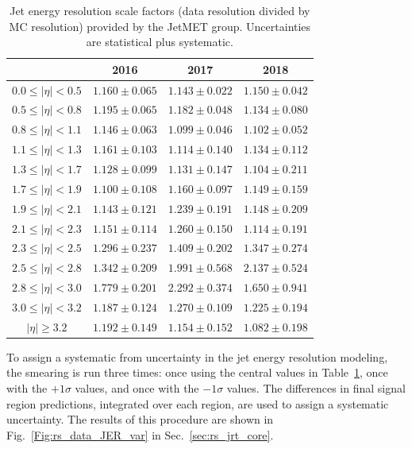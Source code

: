 \begin{table}[htp]
\caption{Jet energy resolution scale factors (data resolution divided by MC resolution) provided by the JetMET group.
             Uncertainties are statistical plus systematic.}
\label{tab:jrt_jersfs}
\centering
\begin{tabular}{|c|ccc|}
\hline
 & 2016 & 2017 & 2018 \\ \hline
$0.0 \leq |\eta| < 0.5$ & $1.160\pm0.065$ & $1.143\pm0.022$ & $1.150\pm0.042$ \\
$0.5 \leq |\eta| < 0.8$ & $1.195\pm0.065$ & $1.182\pm0.048$ & $1.134\pm0.080$ \\
$0.8 \leq |\eta| < 1.1$ & $1.146\pm0.063$ & $1.099\pm0.046$ & $1.102\pm0.052$ \\
$1.1 \leq |\eta| < 1.3$ & $1.161\pm0.103$ & $1.114\pm0.140$ & $1.134\pm0.112$ \\
$1.3 \leq |\eta| < 1.7$ & $1.128\pm0.099$ & $1.131\pm0.147$ & $1.104\pm0.211$ \\
$1.7 \leq |\eta| < 1.9$ & $1.100\pm0.108$ & $1.160\pm0.097$ & $1.149\pm0.159$ \\
$1.9 \leq |\eta| < 2.1$ & $1.143\pm0.121$ & $1.239\pm0.191$ & $1.148\pm0.209$ \\
$2.1 \leq |\eta| < 2.3$ & $1.151\pm0.114$ & $1.260\pm0.150$ & $1.114\pm0.191$ \\
$2.3 \leq |\eta| < 2.5$ & $1.296\pm0.237$ & $1.409\pm0.202$ & $1.347\pm0.274$ \\
$2.5 \leq |\eta| < 2.8$ & $1.342\pm0.209$ & $1.991\pm0.568$ & $2.137\pm0.524$ \\
$2.8 \leq |\eta| < 3.0$ & $1.779\pm0.201$ & $2.292\pm0.374$ & $1.650\pm0.941$ \\
$3.0 \leq |\eta| < 3.2$ & $1.187\pm0.124$ & $1.270\pm0.109$ & $1.225\pm0.194$ \\
$|\eta| \geq 3.2$       & $1.192\pm0.149$ & $1.154\pm0.152$ & $1.082\pm0.198$ \\
\hline
\end{tabular}
\end{table}

To assign a systematic from uncertainty in the jet energy resolution modeling, the smearing is run three times:
once using the central values in Table~\ref{tab:jrt_jersfs}, once with the $+1\sigma$ values,
and once with the $-1\sigma$ values. The differences in final signal region predictions,
integrated over each \Ht region, are used to assign a systematic uncertainty. The results of this
procedure are shown in Fig.~\ref{Fig:rs_data_JER_var} in Sec.~\ref{sec:rs_jrt_core}.

